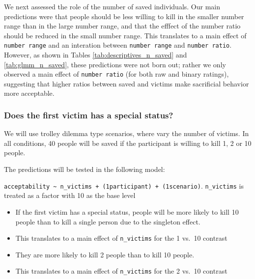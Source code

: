 \documentclass[
]{article}
\providecommand{\tightlist}{%
  \setlength{\itemsep}{0pt}\setlength{\parskip}{0pt}}
\begin{document}
We next assessed the role of the number of saved individuals. Our main predictions were that people should be less willing to kill in the smaller number range than in the large number range, and that the efffect of the number ratio should be reduced in the small number range. This translates to a main effect of \texttt{number\ range} and an interation between \texttt{number\ range} and \texttt{number\ ratio}. However, as shown in Tables \ref{tab:descriptives_n_saved} and \ref{tab:glmm_n_saved}, these predictions were not born out; rather we only observed a main effect of \texttt{number\ ratio} (for both raw and binary ratings), suggesting that higher ratios between saved and victims make sacrificial behavior more acceptable.

\subsubsection{Does the first victim has a special status?}\label{does-the-first-victim-has-a-special-status}

We will use trolley dilemma type scenarios, where vary the number of victims. In all conditions, 40 people will be saved if the participant is willing to kill 1, 2 or 10 people.

The predictions will be tested in the following model:

\textbar{} \texttt{acceptability\ \textasciitilde{}\ n\_victims\ +\ (1\textbar{}participant)\ +\ (1\textbar{}scenario)}. \textbar{} \textbar{} \texttt{n\_victims} is treated as a factor with 10 as the base level

\begin{itemize}
\tightlist
\item
  If the first victim has a special status, people will be more likely to kill 10 people than to kill a single person due to the singleton effect.
\item
  This translates to a main effect of \texttt{n\_victims} for the 1 vs.~10 contrast
\item
  They are more likely to kill 2 people than to kill 10 people.
\item
  This translates to a main effect of \texttt{n\_victims} for the 2 vs.~10 contrast
\end{itemize}
\end{document}
